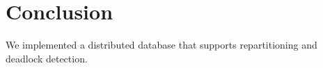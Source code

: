 \documentclass[a4paper, 10pt, notitlepage]{report}
\begin{document}
\section*{Conclusion}
We implemented a distributed database that supports repartitioning and deadlock detection.

\end{document}
